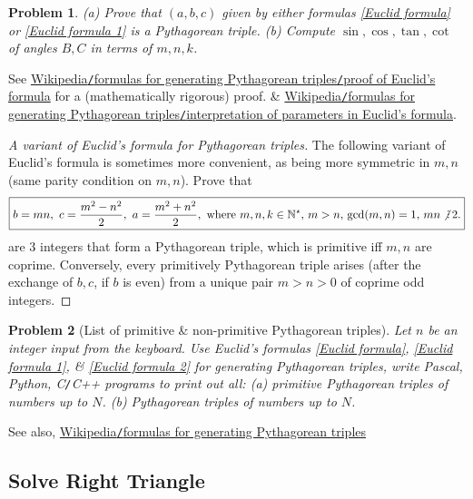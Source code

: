 \documentclass{article}
\newtheorem{problem}{Problem}
\DeclareRobustCommand{\divby}{%
	\mathrel{\vbox{\baselineskip.65ex\lineskiplimit0pt\hbox{.}\hbox{.}\hbox{.}}}%
}
\begin{document}
\begin{problem}
	(a) Prove that $(a,b,c)$ given by either formulas \eqref{Euclid formula} or \eqref{Euclid formula 1} is a Pythagorean triple. (b) Compute $\sin,\cos,\tan,\cot$ of angles $B,C$ in terms of $m,n,k$.
\end{problem}
See \href{https://en.wikipedia.org/wiki/Pythagorean_triple#Proof_of_Euclid's_formula}{Wikipedia{\tt/}formulas for generating Pythagorean triples{\tt/}proof of Euclid's formula} for a (mathematically rigorous) proof. \& \href{https://en.wikipedia.org/wiki/Pythagorean_triple#Interpretation_of_parameters_in_Euclid's_formula}{Wikipedia{\tt/}formulas for generating Pythagorean triples{\tt/}interpretation of parameters in Euclid's formula}.

\begin{proof}[A variant of Euclid's formula for Pythagorean triples]
	The following variant of Euclid's formula is sometimes more convenient, as being more symmetric in $m,n$ (same parity condition on $m,n$). Prove that
	\begin{align}
		\label{Euclid formula 2}
		\boxed{b = mn,\ c = \frac{m^2 - n^2}{2},\ a = \frac{m^2 + n^2}{2},\mbox{ where } m,n,k\in\mathbb{N}^\star,\,m > n,\,{\rm gcd}(m,n) = 1,\,mn\not{\divby}\,2.}
	\end{align}
	are 3 integers that form a Pythagorean triple, which is primitive iff $m,n$ are coprime. Conversely, every primitively Pythagorean triple arises (after the exchange of $b,c$, if $b$ is even) from a unique pair $m > n > 0$ of coprime odd integers.
\end{proof}

\begin{problem}[List of primitive \& non-primitive Pythagorean triples]
	Let $n$ be an integer input from the keyboard. Use Euclid's formulas \eqref{Euclid formula}, \eqref{Euclid formula 1}, \& \eqref{Euclid formula 2} for generating Pythagorean triples, write {\sf Pascal, Python, C{\tt/}C++} programs to print out all: (a) primitive Pythagorean triples of numbers up to $N$. (b) Pythagorean triples of numbers up to $N$.
\end{problem}
See also, \href{https://en.wikipedia.org/wiki/Formulas_for_generating_Pythagorean_triples}{Wikipedia{\tt/}formulas for generating Pythagorean triples}


\subsection{Solve Right Triangle}
\end{document}
